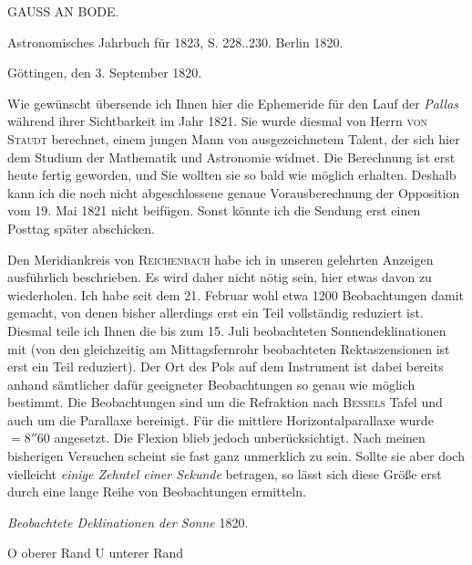 \clearpage
{}
\hypertarget{native-438-part-lower}{}
\begin{center}
{\large GAUSS AN BODE.}

Astronomisches Jahrbuch für 1823, S. 228..230. Berlin 1820.
\end{center}

\hfill Göttingen, den 3. September 1820.

\par\indent Wie gewünscht übersende ich Ihnen hier die Ephemeride für den Lauf der \emph{Pallas} während ihrer Sichtbarkeit im Jahr 1821. Sie wurde diesmal von Herrn \textsc{von Staudt} berechnet, einem jungen Mann von ausgezeichnetem Talent, der sich hier dem Studium der Mathematik und Astronomie widmet. Die Berechnung ist erst heute fertig geworden, und Sie wollten sie so bald wie möglich erhalten. Deshalb kann ich die noch nicht abgeschlossene genaue Vorausberechnung der Opposition vom 19. Mai 1821 nicht beifügen. Sonst könnte ich die Sendung erst einen Posttag später abschicken.

Den Meridiankreis von \textsc{Reichenbach} habe ich in unseren gelehrten Anzeigen ausführlich beschrieben. Es wird daher nicht nötig sein, hier etwas davon zu wiederholen. Ich habe seit dem 21. Februar wohl etwa 1200 Beobachtungen damit gemacht, von denen bisher allerdings erst ein Teil vollständig reduziert ist. Diesmal teile ich Ihnen die bis zum 15. Juli beobachteten Sonnendeklinationen mit (von den gleichzeitig am Mittagsfernrohr beobachteten Rektaszensionen ist erst ein Teil reduziert). Der Ort des Pols auf dem Instrument ist dabei bereits anhand sämtlicher dafür geeigneter Beobachtungen so genau wie möglich bestimmt. Die Beobachtungen sind um die Refraktion nach \textsc{Bessels} Tafel und auch um die Parallaxe bereinigt. Für die mittlere Horizontalparallaxe wurde $=8''60$ angesetzt. Die Flexion blieb jedoch unberücksichtigt. Nach meinen bisherigen Versuchen scheint sie fast ganz unmerklich zu sein. Sollte sie aber doch vielleicht \emph{einige Zehntel einer Sekunde} betragen, so lässt sich diese Größe erst durch eine lange Reihe von Beobachtungen ermitteln.


\begin{center}
\emph{Beobachtete Deklinationen der Sonne} 1820.

O oberer Rand \quad U unterer Rand
\end{center}


